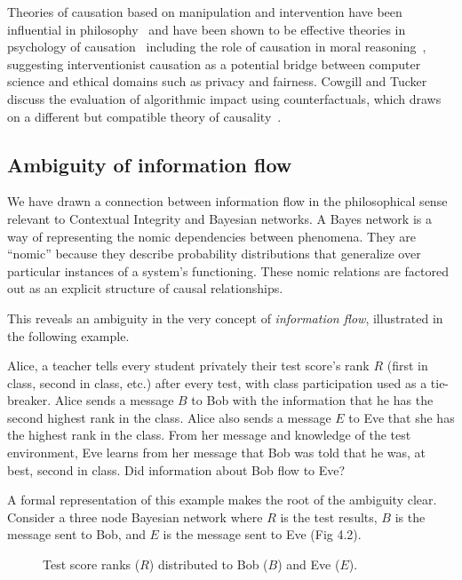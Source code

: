 \documentclass[../thesis.tex]{subfiles}
\begin{document}
Theories of causation based on manipulation and intervention
have been influential in philosophy~\cite{woodward2005making}
and have been shown to be effective theories in
psychology of causation~\cite{sloman2005causal}
including the role of causation in moral 
reasoning~\cite{sloman2009causal}, suggesting interventionist
causation as a potential bridge between computer science
and ethical domains such as privacy and fairness.
Cowgill and Tucker~\cite{cowgillalgorithmic} 
discuss the evaluation
of algorithmic impact using counterfactuals, which
draws on a different but compatible theory of
causality~\cite{rubin1974estimating}.

\subsection{Ambiguity of information flow}
\label{sec:ambiguity}

We have drawn a connection
between information flow in the philosophical sense
relevant to Contextual Integrity and Bayesian networks.
A Bayes network is a way of representing the nomic dependencies
between phenomena.
They are ``nomic'' because they describe probability 
distributions that generalize over particular instances of a 
system's functioning. These nomic relations
are factored out as an explicit structure of causal relationships.

This reveals an ambiguity in the very concept of
\emph{information flow},
illustrated in the following example.

\begin{exm}
Alice, a teacher tells every student
privately their test score's rank $R$ (first in class,
second in class, etc.) after every test, with class
participation used as a tie-breaker.
Alice sends a message $B$ to Bob with the information that
he has the second highest rank in the class.
Alice also sends a message $E$ to Eve that she has
the highest rank in the class.
From her message and knowledge of the test environment,
Eve learns from her message that Bob was told that he
was, at best, second in class.
Did information about Bob flow to Eve?
\end{exm}

A formal representation of this example makes the
root of the ambiguity clear.
Consider a three node Bayesian network where $R$ is the test
results, $B$ is the message sent to Bob, and $E$ is
the message sent to Eve (Fig 4.2).

\begin{figure}
  \label{fig:school}
\begin{center}
\end{center}
\caption{Test score ranks ($R$) distributed to Bob ($B$) and Eve ($E$).}
\end{figure}
\end{document}

